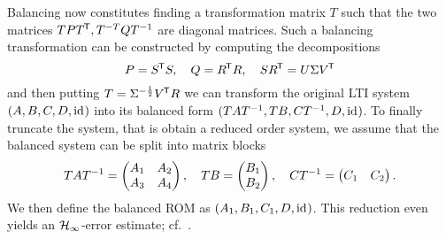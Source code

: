 Balancing now constitutes finding a transformation matrix $T$ such that the two matrices $T P T\trans, T\inv[T] Q T\inv$ are diagonal matrices.
Such a balancing transformation can be constructed by computing the decompositions
\begin{equation}\label{eq:balancing}
    P = S\trans S,\quad Q = R\trans R,\quad S R\trans = U \Sigma V\trans
\end{equation}
and then putting $T = \Sigma\inv[\frac{1}{2}] V\trans R$ we can transform the original LTI system $(A, B, C, D, \id)$ into its balanced form $(T A T\inv, T B, C T\inv, D, \id)$.
To finally truncate the system, that is obtain a reduced order system, we assume that the balanced system can be split into matrix blocks
\begin{equation*}
    T A T\inv = \begin{pmatrix}
        A_1 & A_2 \\
        A_3 & A_4
    \end{pmatrix},\quad T B = \begin{pmatrix}
        B_1 \\
        B_2
    \end{pmatrix},\quad C T\inv = \begin{pmatrix}
        C_1 & C_2
    \end{pmatrix}.
\end{equation*}
We then define the balanced ROM as $(A_1, B_1, C_1, D, \id)$.
This reduction even yields an $\mcl{H}_\infty$-error estimate; cf.~\cite[Theorem~6.4]{BB2017}.


